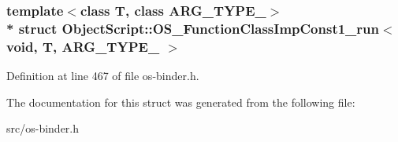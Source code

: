 \subsubsection*{template$<$class T, class A\+R\+G\+\_\+\+T\+Y\+P\+E\+\_$>$\\*
struct Object\+Script\+::\+O\+S\+\_\+\+Function\+Class\+Imp\+Const1\+\_\+run$<$ void, T,   A\+R\+G\+\_\+\+T\+Y\+P\+E\+\_ $>$}



Definition at line 467 of file os-\/binder.\+h.



The documentation for this struct was generated from the following file\+:\begin{DoxyCompactItemize}
\item 
src/os-\/binder.\+h\end{DoxyCompactItemize}
